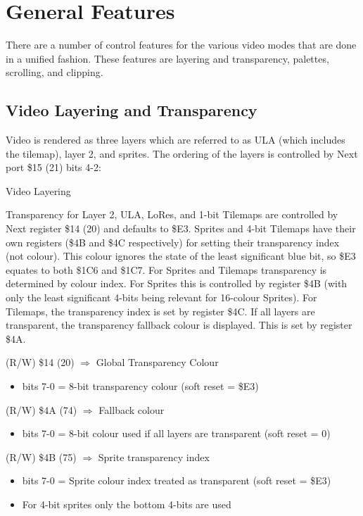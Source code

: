 \section{General Features}
There are a number of control features for the various video modes
that are done in a unified fashion. These features are layering and
transparency, palettes, scrolling, and clipping. 

\subsection{Video Layering and Transparency}
Video is rendered as three layers which are referred to as ULA (which
includes the tilemap), layer 2, and sprites.  The ordering of the
layers is controlled by Next port \$15 (21) bits 4-2:

\begin{table}[h]\centering
  \caption{Video Layering}
\end{table}

Transparency for Layer 2, ULA, LoRes, and 1-bit Tilemaps are
controlled by Next register \$14 (20) and defaults to \$E3. Sprites
and 4-bit Tilemaps have their own registers (\$4B and \$4C
respectively) for setting their transparency index (not colour). This
colour ignores the state of the least significant blue bit, so \$E3
equates to both \$1C6 and \$1C7. For Sprites and Tilemaps transparency
is determined by colour index. For Sprites this is controlled by
register \$4B (with only the least significant 4-bits being relevant
for 16-colour Sprites). For Tilemaps, the transparency index is set by
register \$4C. If all layers are transparent, the transparency
fallback colour is displayed. This is set by register \$4A.

(R/W) \$14 (20) $\Rightarrow$ Global Transparency Colour
\begin{itemize}
\item bits 7-0 = 8-bit transparency colour (soft reset = \$E3)
\end{itemize}

(R/W) \$4A (74) $\Rightarrow$ Fallback colour
\begin{itemize}
\item bits 7-0 = 8-bit colour used if all layers are transparent (soft
  reset = 0)
\end{itemize}

(R/W) \$4B (75) $\Rightarrow$ Sprite transparency index
\begin{itemize}
\item bits 7-0 = Sprite colour index treated as transparent (soft
  reset = \$E3)
\item[] For 4-bit sprites only the bottom 4-bits are used
\end{itemize}

